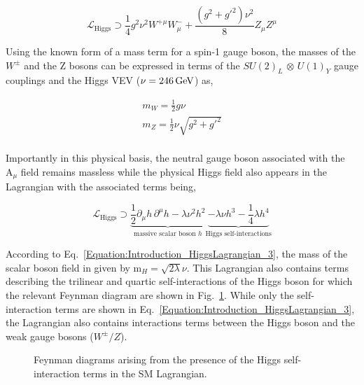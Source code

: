 \begin{equation}
    \mathcal{L}_{\text{Higgs}} \supset \frac{1}{4} g^2 \nu^2 W^{+\mu}W_{\mu}^- + \frac{(g^2+g'^2)\nu^2}{8} Z_\mu Z^\mu
\label{Equation:Introduction_HiggsLagrangian_2}
\end{equation}

Using the known form of a mass term for a spin-1 gauge boson, the masses of the $W^\pm$ and the Z bosons can be expressed in terms of the $SU(2)_{L}$ $\otimes$ $U(1)_{Y}$ gauge couplings and the Higgs VEV ($\nu = 246 \,\text{Ge\hspace{-.08em}V}$) as,

\begin{equation}
\begin{array}{c}
    m_W = \frac{1}{2}g\nu \\
    m_Z = \frac{1}{2}\nu\sqrt{g^2+g'^2}\\
\end{array}
\end{equation}

Importantly in this physical basis, the neutral gauge boson associated with the $\text{A}_\mu$ field remains massless while the physical Higgs field also appears in the Lagrangian with the associated terms being,

\begin{equation}
    \mathcal{L}_{\text{Higgs}} \supset \underbrace{\frac{1}{2} \partial_\mu h \, \partial^\mu h - \lambda \nu^2 h^2}_{\text{massive scalar boson } h}
    \underbrace{- \lambda \nu h^3 - \frac{1}{4} \lambda h^4}_{\text{Higgs self-interactions}}
\label{Equation:Introduction_HiggsLagrangian_3}
\end{equation}

According to Eq.~\ref{Equation:Introduction_HiggsLagrangian_3}, the mass of the scalar boson field in given by $\text{m}_H = \sqrt{2\lambda}\nu$. This Lagrangian also contains terms describing the trilinear and quartic self-interactions of the Higgs boson for which the relevant Feynman diagram are shown in Fig.~\ref{Figure:Introduction_HiggsSelf}. While only the self-interaction terms are shown in Eq.~\ref{Equation:Introduction_HiggsLagrangian_3}, the Lagrangian also contains interactions terms between the Higgs boson and the weak gauge bosons ($W^\pm/Z$). 

\begin{figure}[h]
    \centering
    \begin{subfigure}{0.45\textwidth}
        \centering
        
    \end{subfigure}
    \hfill
    \begin{subfigure}{0.45\textwidth}
        \centering
        
    \end{subfigure}
    \caption{Feynman diagrams arising from the presence of the Higgs self-interaction terms in the SM Lagrangian.}
    \label{Figure:Introduction_HiggsSelf}
\end{figure}

